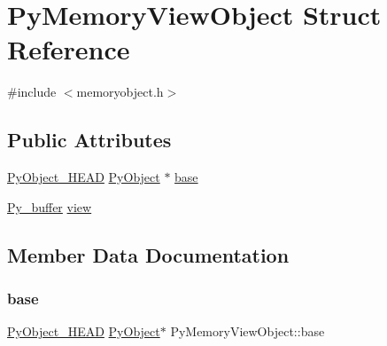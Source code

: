 \hypertarget{struct_py_memory_view_object}{}\section{Py\+Memory\+View\+Object Struct Reference}
\label{struct_py_memory_view_object}


{\ttfamily \#include $<$memoryobject.\+h$>$}

\subsection*{Public Attributes}
\begin{DoxyCompactItemize}
\item 
\mbox{\hyperlink{_python27_2object_8h_a0bf35c1f3ea13f925de94d8593db3b7e}{Py\+Object\+\_\+\+H\+E\+AD}} \mbox{\hyperlink{_python27_2object_8h_aadc84ac7aed2cfa6f20c25f62bf3dac7}{Py\+Object}} $\ast$ \mbox{\hyperlink{struct_py_memory_view_object_a55243c9aa54dca06c5e0e70bf21c9097}{base}}
\item 
\mbox{\hyperlink{_python27_2object_8h_a0c1c5dc66cfb07c46b863b5186f61cf4}{Py\+\_\+buffer}} \mbox{\hyperlink{struct_py_memory_view_object_a0dd3ff4ff4e322d654468e5517b6a6a8}{view}}
\end{DoxyCompactItemize}


\subsection{Member Data Documentation}
\mbox{\label{struct_py_memory_view_object_a55243c9aa54dca06c5e0e70bf21c9097}} 
\subsubsection{\texorpdfstring{base}{base}}
{\footnotesize\ttfamily \mbox{\hyperlink{_python27_2object_8h_a0bf35c1f3ea13f925de94d8593db3b7e}{Py\+Object\+\_\+\+H\+E\+AD}} \mbox{\hyperlink{_python27_2object_8h_aadc84ac7aed2cfa6f20c25f62bf3dac7}{Py\+Object}}$\ast$ Py\+Memory\+View\+Object\+::base}

\mbox{\label{struct_py_memory_view_object_a0dd3ff4ff4e322d654468e5517b6a6a8}} 
